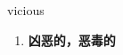 
\begin{frame}
{\huge vicious}
\begin{center}
\begin{enumerate}\Large
  \item \textbf{凶恶的，恶毒的}
\end{enumerate}
\end{center}
\end{frame}
